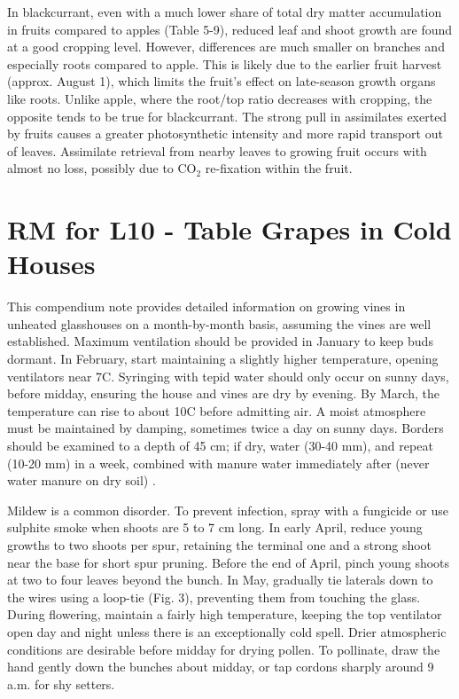 \vspace{0.5em}
In blackcurrant, even with a much lower share of total dry matter accumulation in fruits compared to apples (Table 5-9), reduced leaf and shoot growth are found at a good cropping level. However, differences are much smaller on branches and especially roots compared to apple. This is likely due to the earlier fruit harvest (approx. August 1), which limits the fruit's effect on late-season growth organs like roots. Unlike apple, where the root/top ratio decreases with cropping, the opposite tends to be true for blackcurrant. The strong pull in assimilates exerted by fruits causes a greater photosynthetic intensity and more rapid transport out of leaves. Assimilate retrieval from nearby leaves to growing fruit occurs with almost no loss, possibly due to CO$_2$ re-fixation within the fruit.


\section{RM for L10 - Table Grapes in Cold Houses}

This compendium note provides detailed information on growing vines in unheated glasshouses on a month-by-month basis, assuming the vines are well established. Maximum ventilation should be provided in January to keep buds dormant. In February, start maintaining a slightly higher temperature, opening ventilators near 7\textdegree C. Syringing with tepid water should only occur on sunny days, before midday, ensuring the house and vines are dry by evening. By March, the temperature can rise to about 10\textdegree C before admitting air. A moist atmosphere must be maintained by damping, sometimes twice a day on sunny days. Borders should be examined to a depth of 45 cm; if dry, water (30-40 mm), and repeat (10-20 mm) in a week, combined with manure water immediately after (never water manure on dry soil) \cite*{rmb_02_L10_fundamentals_temperate_zone_tree_fruit_production}.

\vspace{0.5em}
Mildew is a common disorder. To prevent infection, spray with a fungicide or use sulphite smoke when shoots are 5 to 7 cm long. In early April, reduce young growths to two shoots per spur, retaining the terminal one and a strong shoot near the base for short spur pruning. Before the end of April, pinch young shoots at two to four leaves beyond the bunch. In May, gradually tie laterals down to the wires using a loop-tie (Fig. 3), preventing them from touching the glass. During flowering, maintain a fairly high temperature, keeping the top ventilator open day and night unless there is an exceptionally cold spell. Drier atmospheric conditions are desirable before midday for drying pollen. To pollinate, draw the hand gently down the bunches about midday, or tap cordons sharply around 9 a.m. for shy setters.

